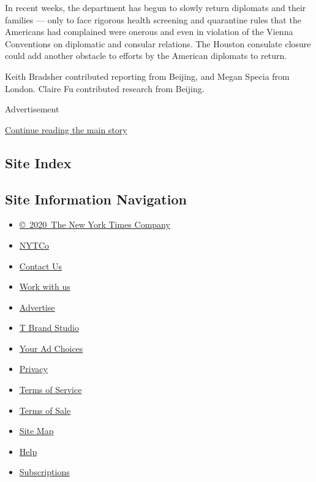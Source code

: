 In recent weeks, the department has begun to slowly return diplomats and
their families --- only to face rigorous health screening and quarantine
rules that the Americans had complained were onerous and even in
violation of the Vienna Conventions on diplomatic and consular
relations. The Houston consulate closure could add another obstacle to
efforts by the American diplomats to return.

Keith Bradsher contributed reporting from Beijing, and Megan Specia from
London. Claire Fu contributed research from Beijing.

Advertisement

\protect\hyperlink{after-bottom}{Continue reading the main story}

\hypertarget{site-index}{%
\subsection{Site Index}\label{site-index}}

\hypertarget{site-information-navigation}{%
\subsection{Site Information
Navigation}\label{site-information-navigation}}

\begin{itemize}
\tightlist
\item
  \href{https://help.nytimes3xbfgragh.onion/hc/en-us/articles/115014792127-Copyright-notice}{©~2020~The
  New York Times Company}
\end{itemize}

\begin{itemize}
\tightlist
\item
  \href{https://www.nytco.com/}{NYTCo}
\item
  \href{https://help.nytimes3xbfgragh.onion/hc/en-us/articles/115015385887-Contact-Us}{Contact
  Us}
\item
  \href{https://www.nytco.com/careers/}{Work with us}
\item
  \href{https://nytmediakit.com/}{Advertise}
\item
  \href{http://www.tbrandstudio.com/}{T Brand Studio}
\item
  \href{https://www.nytimes3xbfgragh.onion/privacy/cookie-policy\#how-do-i-manage-trackers}{Your
  Ad Choices}
\item
  \href{https://www.nytimes3xbfgragh.onion/privacy}{Privacy}
\item
  \href{https://help.nytimes3xbfgragh.onion/hc/en-us/articles/115014893428-Terms-of-service}{Terms
  of Service}
\item
  \href{https://help.nytimes3xbfgragh.onion/hc/en-us/articles/115014893968-Terms-of-sale}{Terms
  of Sale}
\item
  \href{https://spiderbites.nytimes3xbfgragh.onion}{Site Map}
\item
  \href{https://help.nytimes3xbfgragh.onion/hc/en-us}{Help}
\item
  \href{https://www.nytimes3xbfgragh.onion/subscription?campaignId=37WXW}{Subscriptions}
\end{itemize}
